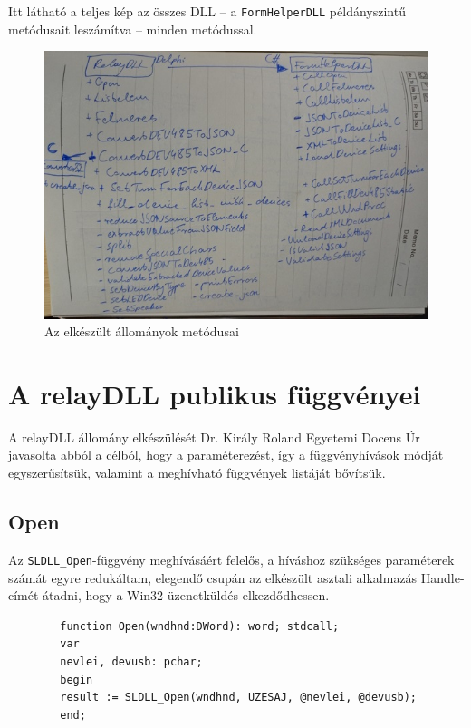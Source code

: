 \documentclass[tocnopagenum]{thesis-ekf}
\begin{document}
	Itt látható a teljes kép az összes DLL -- a \verb*|FormHelperDLL| példányszintű metódusait leszámítva -- minden metódussal.
	\begin{figure}[H]
	\centering
	\hspace*{-0.5in}
	\includegraphics[scale=0.7]{images/fuggvenyek_kezi.jpg}
	\caption{Az elkészült állományok metódusai}
	\label{fig:fuggvenyek_kezi}
	\end{figure}
	\section{A relayDLL publikus függvényei}
	A relayDLL állomány elkészülését Dr. Király Roland Egyetemi Docens Úr javasolta abból a célból, hogy a paraméterezést, így a függvényhívások módját egyszerűsítsük, valamint a meghívható függvények listáját bővítsük.
	\subsection{Open} Az \verb*|SLDLL_Open|-függvény meghívásáért felelős, a híváshoz szükséges paraméterek számát egyre redukáltam, elegendő csupán az elkészült asztali alkalmazás Handle-címét átadni, hogy a Win32-üzenetküldés elkezdődhessen.
	
	\begin{verbatim}
		function Open(wndhnd:DWord): word; stdcall;
		var
		nevlei, devusb: pchar;
		begin
		result := SLDLL_Open(wndhnd, UZESAJ, @nevlei, @devusb); 
		end;
	\end{verbatim}
\end{document}
